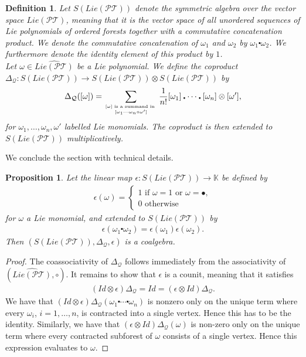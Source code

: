 \documentclass[10pt,a4paper]{article}
\newtheorem{proposition}[theorem]{Proposition}
\newtheorem{definition}{Definition}
\begin{document}
\begin{definition}
Let $S(Lie(\mathcal{PT}))$ denote the symmetric algebra over the vector space $Lie(\mathcal{PT})$, meaning that it is the vector space of all unordered sequences of Lie polynomials of ordered forests together with a commutative concatenation product. We denote the commutative concatenation of $\omega_1$ and $\omega_2$ by $\omega_1\centerdot\omega_2$. We furthermore denote the identity element of this product by $1$. \\
Let $\omega \in \widehat{Lie(\mathcal{PT})}$ be a Lie polynomial. We define the coproduct $\Delta_{\mathcal{Q}}: S(Lie(\mathcal{PT})) \to S(Lie(\mathcal{PT})) \otimes S(Lie(\mathcal{PT}))$ by
\begin{align*}
\Delta_{\mathcal{Q}}([\omega])=\sum_{[\omega] \text{ is a summand in } \atop [\omega_1 \cdots \omega_n \circ \omega']}\frac{1}{n!} [\omega_1]\centerdot \cdots \centerdot[\omega_n] \otimes [\omega'],
\end{align*}
for $\omega_1,\dots,\omega_n,\omega'$ labelled Lie monomials. The coproduct is then extended to $S(Lie(\mathcal{PT}))$ multiplicatively.
\end{definition}

We conclude the section with technical details.

\begin{proposition}
Let the linear map $\epsilon: S(Lie(\mathcal{PT})) \to \mathbb{K}$ be defined by
\begin{align*}
\epsilon(\omega)=\begin{cases*}
1  \text{ if } \omega=1 \text{ or } \omega=\bullet, \\
0  \text{ otherwise}
\end{cases*}
\end{align*}
for $\omega$ a Lie monomial, and extended to $S(Lie(\mathcal{PT}))$ by
\begin{align*}
\epsilon(\omega_1\centerdot \omega_2)=\epsilon(\omega_1)\epsilon(\omega_2).
\end{align*}
Then $(S(Lie(\mathcal{PT})),\Delta_{\mathcal{Q}},\epsilon)$ is a coalgebra.
\end{proposition}

\begin{proof}
The coassociativity of $\Delta_{\mathcal{Q}}$ follows immediately from the associativity of $(\widehat{Lie(\mathcal{PT})},\circ)$. It remains to show that $\epsilon$ is a counit, meaning that it satisfies
\begin{align*}
(Id \otimes \epsilon)\Delta_{\mathcal{Q}}=Id=(\epsilon \otimes Id)\Delta_{\mathcal{Q}}.
\end{align*}
We have that $(Id \otimes \epsilon)\Delta_{\mathcal{Q}}(\omega_1 \centerdot \cdots \centerdot \omega_n)$ is nonzero only on the unique term where every $\omega_i$, $i=1,\dots,n$, is contracted into a single vertex. Hence this has to be the identity. Similarly, we have that $(\epsilon \otimes Id)\Delta_{\mathcal{Q}}(\omega)$ is non-zero only on the unique term where every contracted subforest of $\omega$ consists of a single vertex. Hence this expression evaluates to $\omega$.
\end{proof}
\end{document}
